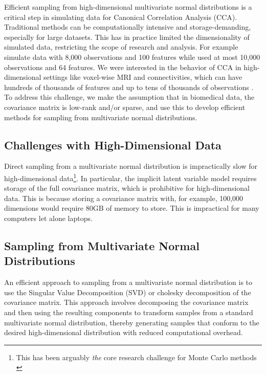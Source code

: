 Efficient sampling from high-dimensional multivariate normal distributions is a critical step in simulating data for Canonical Correlation Analysis (CCA). Traditional methods can be computationally intensive and storage-demanding, especially for large datasets.
This has in practice limited the dimensionality of simulated data, restricting the scope of research and analysis.
For example \citet{matkovic2023contribution} simulate data with 8,000 observations and 100 features while \citet{helmer2020stability} used at most 10,000 observations and 64 features.
We were interested in the behavior of CCA in high-dimensional settings like voxel-wise MRI and connectivities, which can have hundreds of thousands of features \citep{jack2008alzheimer} and up to tens of thousands of observations \citep{sudlow2015uk}.
To address this challenge, we make the assumption that in biomedical data, the covariance matrix is low-rank and/or sparse, and use this to develop efficient methods for sampling from multivariate normal distributions.

\subsection{Challenges with High-Dimensional Data}
Direct sampling from a multivariate normal distribution is impractically slow for high-dimensional data\footnote{This has been arguably \textit{the} core research challenge for Monte Carlo methods \citep{mackay1998introduction}}.
In particular, the implicit latent variable model requires storage of the full covariance matrix, which is prohibitive for high-dimensional data.
This is because storing a covariance matrix with, for example, 100,000 dimensions would require 80GB of memory to store.
This is impractical for many computers let alone laptops.

\subsection{Sampling from Multivariate Normal Distributions}
An efficient approach to sampling from a multivariate normal distribution is to use the Singular Value Decomposition (SVD) or cholesky decomposition of the covariance matrix.
This approach involves decomposing the covariance matrix and then using the resulting components to transform samples from a standard multivariate normal distribution, thereby generating samples that conform to the desired high-dimensional distribution with reduced computational overhead.

